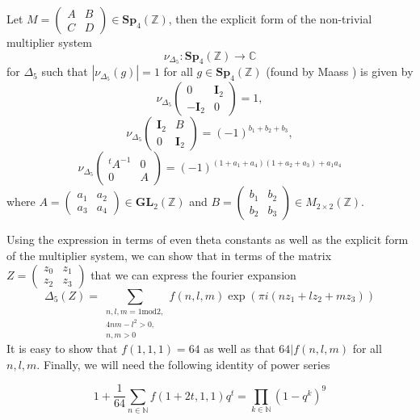 \documentclass[9pt]{amsart} \usepackage[utf8]{inputenc}
\newcommand{\Z}{\mathbb{Z}} \newcommand{\C}{\mathbb{C}}
\newcommand{\Sp}{\mathbf{Sp}}
\newcommand{\GL}{\mathbf{GL}}
\newcommand{\Id}{\mathbf{I}}
\begin{document}
Let $M = \begin{pmatrix} A & B\\
C & D\end{pmatrix} \in \Sp_4(\Z)$, then the explicit form of the
non-trivial multiplier system $$\nu_{\Delta_5}:
\Sp_4(\Z) \rightarrow \C$$ for $\Delta_5$
such that $|\nu_{\Delta_5}(g)| = 1$ for all $g \in \Sp_4(\Z)$
(found by Maass \cite{MAASS:1}) is given by
$$\nu_{\Delta_5}\begin{pmatrix}0 & \Id_2\\
-\Id_2 & 0\end{pmatrix} = 1,$$ $$\nu_{\Delta_5}\begin{pmatrix}\Id_2 & B\\
0 & \Id_2\end{pmatrix} = (-1)^{b_1 + b_2 + b_3},$$
$$\nu_{\Delta_5}\begin{pmatrix}{}^tA^{-1} & 0\\
0 & A\end{pmatrix} = (-1)^{(1 + a_1 + a_4)(1 + a_2 + a_3) + a_1a_4}$$
where $A = \begin{pmatrix}a_1 & a_2\\
a_3 & a_4\end{pmatrix} \in \GL_2(\Z)$ and $B = \begin{pmatrix}b_1 &
b_2\\
b_2 & b_3\end{pmatrix} \in M_{2\times2}(\Z).$



Using the expression in terms of even theta constants as well as the
explicit form of the multiplier system, we can show that
in terms of the matrix $Z=\begin{pmatrix}z_0 & z_1\\ z_2 &
z_3\end{pmatrix}$ that we can express the fourier expansion $$\Delta_5(Z) =
\displaystyle\sum_{\substack{n,l,m = 1 \textrm{mod} 2,\\4nm - l^2 > 0,\\ n,m > 0}} f(n,l,m)\exp(\pi
i(n z_1 + l z_2 + mz_3))$$ It is easy to show that $f(1,1,1) = 64$ as
well as that $64 | f(n,l,m)$ for all $n,l,m$.  Finally, we
will need the following identity of power series

$$1 + \frac{1}{64} \displaystyle\sum_{n\in \mathbb{N}} f(1+2t, 1, 1)q^t
= \displaystyle\prod_{k\in
\mathbb{N}}(1 - q^k)^9$$
\end{document}
